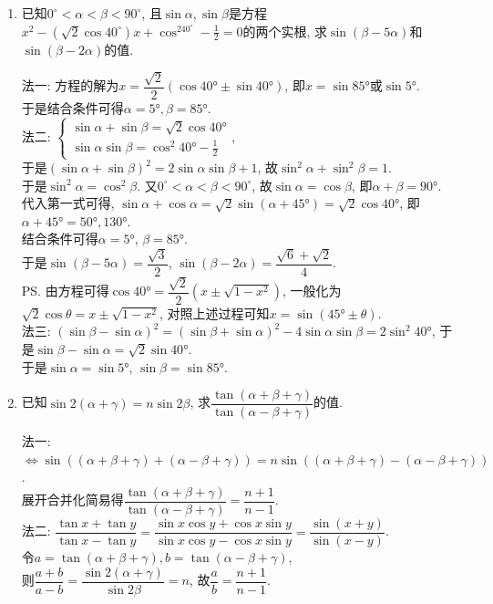 \begin{enumerate}
\item 已知$0^\circ<\alpha<\beta<90^\circ$, 且$\sin\alpha,\sin\beta$是方程$x^2-(\sqrt2\cos40^\circ)x+\cos^240^{\circ}-\frac{1}{2}=0$的两个实根, 
求$\sin(\beta-5\alpha)$和$\sin(\beta-2\alpha)$的值. 
\begin{jieda}
法一: 方程的解为$x=\dfrac{\sqrt{2}}{2}(\cos\ang{40}\pm\sin\ang{40})$, 即$x=\sin\ang{85}$或$\sin\ang{5}$. \\
于是结合条件可得$\alpha=\ang{5},\beta=\ang{85}$. \\
法二: $\begin{cases}
\sin\alpha+\sin\beta=\sqrt{2}\cos\ang{40}\\
\sin\alpha\sin\beta=\cos^2\ang{40}-\frac{1}{2}
\end{cases}$, \\
于是$(\sin\alpha+\sin\beta)^2=2\sin\alpha\sin\beta+1$, 故$\sin^2\alpha+\sin^2\beta=1$. \\
于是$\sin^2\alpha=\cos^2\beta$. 又$0^\circ<\alpha<\beta<90^\circ$, 故$\sin\alpha=\cos\beta$, 即$\alpha+\beta=\ang{90}$. \\
代入第一式可得, $\sin\alpha+\cos\alpha=\sqrt{2}\sin(\alpha+\ang{45})=\sqrt{2}\cos\ang{40}$, 即$\alpha+\ang{45}=\ang{50},\ang{130}$. \\
结合条件可得$\alpha=\ang{5}$, $\beta=\ang{85}$. \\
于是$\sin(\beta-5\alpha)=\dfrac{\sqrt{3}}{2}$, $\sin(\beta-2\alpha)=\dfrac{\sqrt{6}+\sqrt{2}}{4}$. \\
\ps 由方程可得$\cos\ang{40}=\dfrac{\sqrt{2}}{2}(x\pm\sqrt{1-x^2})$, 一般化为$\sqrt{2}\cos\theta=x\pm\sqrt{1-x^2}$, 对照上述过程可知$x=\sin(\ang{45}\pm\theta)$. \\
法三: $(\sin\beta-\sin\alpha)^2=(\sin\beta+\sin\alpha)^2-4\sin\alpha\sin\beta=2\sin^2\ang{40}$, 于是$\sin\beta-\sin\alpha=\sqrt{2}\sin\ang{40}$. \\
于是$\sin\alpha=\sin\ang{5}$, $\sin\beta=\sin\ang{85}$. 
\end{jieda}

\item 已知$\sin2(\alpha+\gamma)=n\sin2\beta$, 求$\dfrac{\tan(\alpha+\beta+\gamma)}{\tan(\alpha-\beta+\gamma)}$的值. 
\begin{jieda}
法一: $\iff\sin((\alpha+\beta+\gamma)+(\alpha-\beta+\gamma))=n\sin((\alpha+\beta+\gamma)-(\alpha-\beta+\gamma))$. \\
展开合并化简易得$\dfrac{\tan(\alpha+\beta+\gamma)}{\tan(\alpha-\beta+\gamma)}=\dfrac{n+1}{n-1}$. \\
法二: $\dfrac{\tan{x}+\tan{y}}{\tan{x}-\tan{y}}=\dfrac{\sin{x}\cos{y}+\cos{x}\sin{y}}{\sin{x}\cos{y}-\cos{x}\sin{y}}=\dfrac{\sin(x+y)}{\sin(x-y)}$. \\
令$a=\tan(\alpha+\beta+\gamma), b=\tan(\alpha-\beta+\gamma)$, \\
则$\dfrac{a+b}{a-b}=\dfrac{\sin2(\alpha+\gamma)}{\sin2\beta}=n$, 
故$\dfrac{a}{b}=\dfrac{n+1}{n-1}$. 
\end{jieda}
\end{enumerate}





